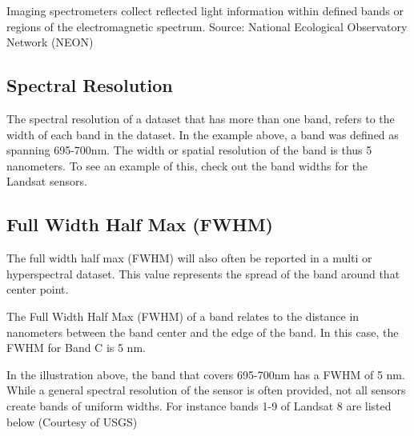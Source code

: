 \documentclass[]{book}
\begin{document}
Imaging spectrometers collect reflected light information within
defined bands or regions of the electromagnetic spectrum. Source: National
Ecological Observatory Network (NEON)

\hypertarget{spectral-resolution}{%
\subsection{Spectral Resolution}\label{spectral-resolution}}

The spectral resolution of a dataset that has more than one band, refers to the
width of each band in the dataset. In the example above, a band was defined as
spanning 695-700nm. The width or spatial resolution of the band is thus 5
nanometers. To see an example of this, check out the band widths for the
Landsat sensors.

\hypertarget{full-width-half-max-fwhm}{%
\subsection{Full Width Half Max (FWHM)}\label{full-width-half-max-fwhm}}

The full width half max (FWHM) will also often be reported in a multi or
hyperspectral dataset. This value represents the spread of the band around that
center point.

The Full Width Half Max (FWHM) of a band relates to the distance
in nanometers between the band center and the edge of the band. In this
case, the FWHM for Band C is 5 nm.

In the illustration above, the band that covers 695-700nm has a FWHM of 5 nm.
While a general spectral resolution of the sensor is often provided, not all
sensors create bands of uniform widths. For instance bands 1-9 of Landsat 8 are
listed below (Courtesy of USGS)
\end{document}
